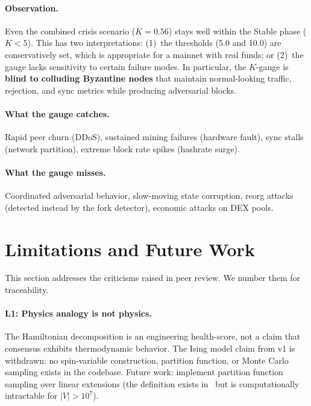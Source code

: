 \documentclass[11pt,a4paper,twocolumn]{article}
\begin{document}
\paragraph{Observation.} Even the combined crisis scenario ($K = 0.56$) stays well within the Stable phase ($K < 5$). This has two interpretations: (1)~the thresholds (5.0 and 10.0) are conservatively set, which is appropriate for a mainnet with real funds; or (2)~the gauge lacks sensitivity to certain failure modes. In particular, the $K$-gauge is \textbf{blind to colluding Byzantine nodes} that maintain normal-looking traffic, rejection, and sync metrics while producing adversarial blocks.

\paragraph{What the gauge catches.} Rapid peer churn (DDoS), sustained mining failures (hardware fault), sync stalls (network partition), extreme block rate spikes (hashrate surge).

\paragraph{What the gauge misses.} Coordinated adversarial behavior, slow-moving state corruption, reorg attacks (detected instead by the fork detector), economic attacks on DEX pools.

\section{Limitations and Future Work}
\label{sec:limitations}

This section addresses the criticisms raised in peer review. We number them for traceability.

\paragraph{L1: Physics analogy is not physics.} The Hamiltonian decomposition is an engineering health-score, not a claim that consensus exhibits thermodynamic behavior. The Ising model claim from v1 is withdrawn: no spin-variable construction, partition function, or Monte Carlo sampling exists in the codebase. Future work: implement partition function sampling over linear extensions (the definition exists in~\cite{qnk-node-system} but is computationally intractable for $|V| > 10^7$).
\end{document}
